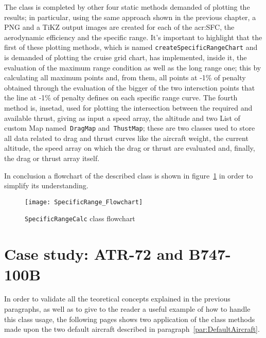 \bigskip
\noindent
The class is completed by other four static methods demanded of plotting the results; in particular, using the same approach shown in the previous chapter, a \gls{PNG} and a \gls{TiKZ} output images are created for each of the \gls{acr:SFC}, the aerodynamic efficiency and the specific range.
%
It's important to highlight that the first of these plotting methods, which is named \lstinline[language=Java]!createSpecificRangeChart! and is demanded of plotting the cruise grid chart, has implemented, inside it, the evaluation of the maximum range condition as well as the long range one; this by calculating all maximum points and, from them, all points at -1\% of penalty obtained through the evaluation of the bigger of the two intersction points that the line at -1\% of penalty defines on each specific range curve.
%
\noindent
The fourth method is, insetad, used for plotting the intersection between the required and available thrust, giving as input a speed array, the altitude and two \gls{List} of custom \gls{Map} named~\lstinline[language=Java]!DragMap! and~\lstinline[language=Java]!ThustMap!; these are two classes used to store all data related to drag and thrust curves like the aircraft weight, the current altitude, the speed array on which the drag or thrust are evaluated and, finally, the drag or thrust array itself.  

\bigskip
\noindent
In conclusion a flowchart of the described class is shown in figure~\ref{fig:Figure7} in order to simplify its understanding.
%
\begin{figure}[t]
\centering
\texttt{[image: SpecificRange\_Flowchart]}
\caption{\lstinline[language=Java]!SpecificRangeCalc! class flowchart}
\label{fig:Figure7}
\end{figure}
%
\section{Case study: ATR-72 and B747-100B}
%
In order to validate all the teoretical concepts explained in the previous paragraphs, as well as to give to the reader a useful example of how to handle this class usage, the following pages shows two application of the class methods made upon the two default aircraft described in paragraph~\ref{par:DefaultAircraft}.

